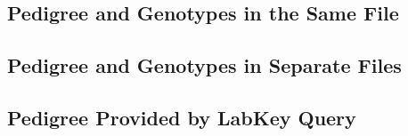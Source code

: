 \documentclass[]{article}
\begin{document}
\hypertarget{pedigree-and-genotypes-in-the-same-file}{%
\subsection{Pedigree and Genotypes in the Same
File}\label{pedigree-and-genotypes-in-the-same-file}}

\hypertarget{pedigree-and-genotypes-in-separate-files}{%
\subsection{Pedigree and Genotypes in Separate
Files}\label{pedigree-and-genotypes-in-separate-files}}

\hypertarget{pedigree-provided-by-labkey-query}{%
\subsection{Pedigree Provided by LabKey
Query}\label{pedigree-provided-by-labkey-query}}
\end{document}
